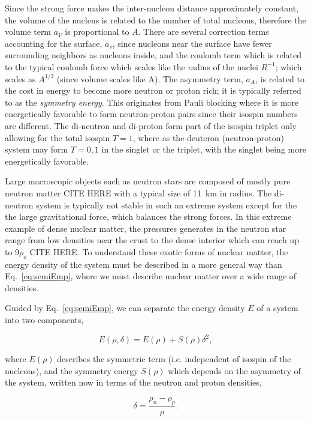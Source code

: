 Since the strong force makes the inter-nucleon distance approximately constant, the volume of the nucleus is related to the number of total nucleons, therefore the volume term $a_V$ is proportional to $A$. There are several correction terms accounting for the surface, $a_s$, since nucleons near the surface have fewer surrounding neighbors as nucleons inside, and the coulomb term which is related to the typical coulomb force which scales like the radius of the nuclei $R^{-1}$; which scales as $A^{1/3}$ (since volume scales like A). The asymmetry term, $a_A$, is related to the cost in energy to become more neutron or proton rich; it is typically referred to as the \emph{symmetry energy}. This originates from Pauli blocking where it is more energetically favorable to form neutron-proton pairs since their isospin numbers are different. The di-neutron and di-proton form part of the isospin triplet only allowing for the total isospin $T=1$, where as the deuteron (neutron-proton) system may form $T={0,1}$ in the singlet or the triplet, with the singlet being more energetically favorable. 

Large macroscopic objects such as neutron stars are composed of mostly pure neutron matter CITE HERE with a typical size of \SI{11}{\kilo\metre} in radius. The di-neutron system is typically not stable in such an extreme system except for the the large gravitational force, which balances the strong forces. In this extreme example of dense nuclear matter, the pressures generates in the neutron star range from low densities near the crust to the dense interior which can reach up to 9$\rho_o$ CITE HERE. To understand these exotic forms of nuclear matter, the energy density of the system must be described in a more general way than Eq.~\ref{eq:semiEmp}, where we must describe nuclear matter over a wide range of densities. 

Guided by Eq.~\ref{eq:semiEmp}, we can separate the energy density $E$ of a system into two components,

\begin{equation}
E(\rho,\delta) = E(\rho	) + S(\rho)\delta^2,
\label{eq:energyEos}
\end{equation}

where $E(\rho)$ describes the symmetric term (i.e. independent of isospin of the nucleons), and the symmetry energy $S(\rho)$ which depends on the asymmetry of the system, written now in terms of the neutron and proton densities, 

\begin{equation}
\delta = \frac{\rho_n - \rho_p}{\rho}.
\label{eq:asym}
\end{equation}

